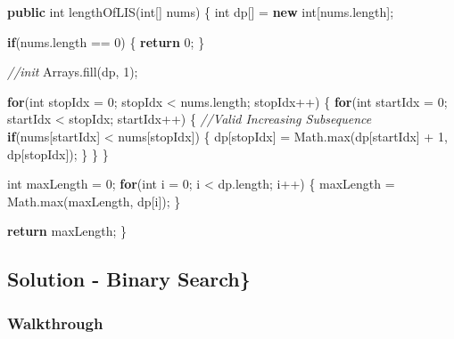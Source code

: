 \documentclass[]{book}
\newenvironment{Shaded}{\begin{snugshade}}{\end{snugshade}}
\newcommand{\BuiltInTok}[1]{#1}
\newcommand{\CommentTok}[1]{\textcolor[rgb]{0.56,0.35,0.01}{\textit{#1}}}
\newcommand{\DataTypeTok}[1]{\textcolor[rgb]{0.13,0.29,0.53}{#1}}
\newcommand{\DecValTok}[1]{\textcolor[rgb]{0.00,0.00,0.81}{#1}}
\newcommand{\FunctionTok}[1]{\textcolor[rgb]{0.00,0.00,0.00}{#1}}
\newcommand{\KeywordTok}[1]{\textcolor[rgb]{0.13,0.29,0.53}{\textbf{#1}}}
\newcommand{\NormalTok}[1]{#1}
\begin{document}
\begin{Shaded}
\begin{Highlighting}[]
\KeywordTok{public} \DataTypeTok{int} \FunctionTok{lengthOfLIS}\NormalTok{(}\DataTypeTok{int}\NormalTok{[] nums) \{}
    \DataTypeTok{int}\NormalTok{ dp[] = }\KeywordTok{new} \DataTypeTok{int}\NormalTok{[nums.}\FunctionTok{length}\NormalTok{];}

    \KeywordTok{if}\NormalTok{(nums.}\FunctionTok{length}\NormalTok{ == }\DecValTok{0}\NormalTok{) \{}
        \KeywordTok{return} \DecValTok{0}\NormalTok{;}
\NormalTok{    \}}

    \CommentTok{//init}
    \BuiltInTok{Arrays}\NormalTok{.}\FunctionTok{fill}\NormalTok{(dp, }\DecValTok{1}\NormalTok{);}

    \KeywordTok{for}\NormalTok{(}\DataTypeTok{int}\NormalTok{ stopIdx = }\DecValTok{0}\NormalTok{; stopIdx < nums.}\FunctionTok{length}\NormalTok{; stopIdx++) \{}
        \KeywordTok{for}\NormalTok{(}\DataTypeTok{int}\NormalTok{ startIdx = }\DecValTok{0}\NormalTok{; startIdx < stopIdx; startIdx++) \{}
            \CommentTok{//Valid Increasing Subsequence}
            \KeywordTok{if}\NormalTok{(nums[startIdx] < nums[stopIdx]) \{}
\NormalTok{                dp[stopIdx] = }\BuiltInTok{Math}\NormalTok{.}\FunctionTok{max}\NormalTok{(dp[startIdx] + }\DecValTok{1}\NormalTok{, dp[stopIdx]);}
\NormalTok{            \}}
\NormalTok{        \}}
\NormalTok{    \}}

    \DataTypeTok{int}\NormalTok{ maxLength = }\DecValTok{0}\NormalTok{;}
    \KeywordTok{for}\NormalTok{(}\DataTypeTok{int}\NormalTok{ i = }\DecValTok{0}\NormalTok{; i < dp.}\FunctionTok{length}\NormalTok{; i++) \{}
\NormalTok{        maxLength = }\BuiltInTok{Math}\NormalTok{.}\FunctionTok{max}\NormalTok{(maxLength, dp[i]);}
\NormalTok{    \}}

    \KeywordTok{return}\NormalTok{ maxLength;}
\NormalTok{\}}
\end{Highlighting}
\end{Shaded}

\hypertarget{solution---binary-search}{%
\subsection{Solution - Binary Search\}}\label{solution---binary-search}}

\hypertarget{walkthrough-28}{%
\subsubsection{Walkthrough}\label{walkthrough-28}}
\end{document}
